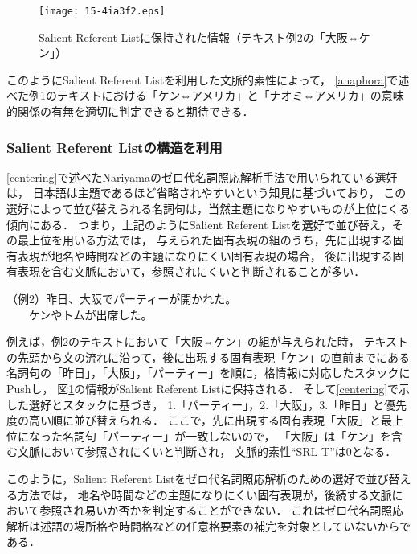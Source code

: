 \documentclass[japanese]{jnlp_1.4}
\begin{document}
\begin{figure}[t]
  \begin{center}
  \texttt{[image: 15-4ia3f2.eps]}
  \end{center}
  \caption{Salient Referent Listに保持された情報（テキスト例2の「大阪⇔ケン」）}
  \label{center2}
\end{figure}

このようにSalient Referent Listを利用した文脈的素性によって，
{\ref{anaphora}}で述べた例1のテキストにおける「ケン⇔アメリカ」と「ナオミ⇔アメリカ」の意味的関係の有無を適切に判定できると期待できる．


\subsubsection{Salient Referent Listの構造を利用}
\label{riyou}

{\ref{centering}}で述べたNariyamaのゼロ代名詞照応解析手法で用いられている選好は，
日本語は主題であるほど省略されやすいという知見に基づいており，
この選好によって並び替えられる名詞句は，当然主題になりやすいものが上位にくる傾向にある．
つまり，上記のようにSalient Referent Listを選好で並び替え，その最上位を用いる方法では，
与えられた固有表現の組のうち，先に出現する固有表現が地名や時間などの主題になりにくい固有表現の場合，
後に出現する固有表現を含む文脈において，参照されにくいと判断されることが多い．

\vspace{1\baselineskip}
（例2）昨日、大阪でパーティーが開かれた。\\
　　\phantom{（例2）}ケンやトムが出席した。
\vspace{1\baselineskip}

例えば，例2のテキストにおいて「大阪⇔ケン」の組が与えられた時，
テキストの先頭から文の流れに沿って，後に出現する固有表現「ケン」の直前までにある
名詞句の「昨日」，「大阪」，「パーティー」を順に，格情報に対応したスタックにPushし，
図{\ref{center2}}の情報がSalient Referent Listに保持される．
そして{\ref{centering}}で示した選好とスタックに基づき，
1.「パーティー」，2.「大阪」，3.「昨日」と優先度の高い順に並び替えられる．
ここで，先に出現する固有表現「大阪」と最上位になった名詞句「パーティー」が一致しないので，
「大阪」は「ケン」を含む文脈において参照されにくいと判断され，
文脈的素性``SRL-T''は0となる．

このように，Salient Referent Listをゼロ代名詞照応解析のための選好で並び替える方法では，
地名や時間などの主題になりにくい固有表現が，後続する文脈において参照され易いか否かを判定することができない．
これはゼロ代名詞照応解析は述語の場所格や時間格などの任意格要素の補完を対象としていないからである．
\end{document}
